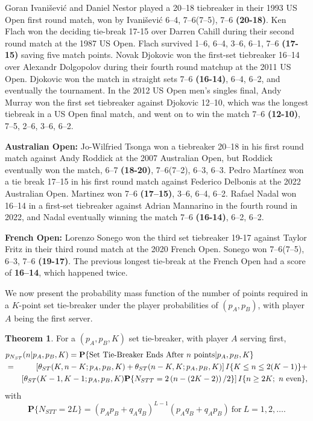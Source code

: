 \documentclass[11pt]{article}
\theoremstyle{plain}
\theoremstyle{definition}
\newtheorem{theorem}{Theorem}[section]
\renewcommand{\Pr}{\mathbf{P}}
\begin{document}
\smallskip

 Goran Ivanišević and Daniel Nestor played a 20–18 tiebreaker in their 1993 US Open first round match, won by Ivanišević 6–4, 7–6(7–5), 7–6 {\bf (20-18)}. Ken Flach won the deciding tie-break {17-15} over Darren Cahill during their second round match at the 1987 US Open. Flach survived 1–6, 6–4, 3–6, 6–1, 7–6 {\bf (17-15)}  saving five match points. Novak Djokovic won the first-set tiebreaker 16–14 over Alexandr Dolgopolov during their fourth round matchup at the 2011 US Open. Djokovic won the match in straight sets 7–6 {\bf (16-14)}, 6–4, 6–2, and eventually the tournament. In the 2012 US Open men's singles final, Andy Murray won the first set tiebreaker against Djokovic 12–10, which was the longest tiebreak in a US Open final match, and went on to win the match 7–6 {\bf (12-10)}, 7–5, 2–6, 3–6, 6–2. 

\smallskip

\noindent
{\bf Australian Open:} Jo-Wilfried Tsonga won a tiebreaker 20–18 in his first round match against Andy Roddick at the 2007 Australian Open, but Roddick eventually won the match, 6–7 {\bf (18-20)}, 7–6(7–2), 6–3, 6–3. Pedro Martínez won a tie break 17–15 in his first round match against Federico Delbonis at the 2022 Australian Open. Martinez won 7–6 {\bf (17–15)}, 3–6, 6–4, 6–2. Rafael Nadal won 16–14 in a first-set tiebreaker against Adrian Mannarino in the fourth round in 2022, and Nadal eventually winning the match 7–6 {\bf (16-14)}, 6–2, 6–2. 

\smallskip

\noindent
{\bf French Open:} Lorenzo Sonego won the third set tiebreaker {19-17} against Taylor Fritz in their third round match at the 2020 French Open. Sonego won 7–6(7–5), 6–3, 7–6 {\bf (19-17)}. The previous longest tie-break at the French Open had a score of {\bf 16–14}, which happened twice. 

\medskip

We now present the probability mass function of the number of points required in a $K$-point set tie-breaker under the player probabilities of $(p_A,p_B)$, with player $A$ being the first server.


\begin{theorem}
    For a $(p_A,p_B,K)$ set tie-breaker, with player $A$ serving first,
\begin{eqnarray*}
    \lefteqn{ p_{N_{ST}}(n|p_A,p_B,K) = \Pr\{\mbox{Set Tie-Breaker Ends After $n$ points}|p_A,p_B,K\} } \\ & = &
    \left[\theta_{ST}(K,n-K;p_A,p_B,K) + \theta_{ST}(n-K,K;p_A,p_B,K)\right] I\{K \le n \le 2(K-1)\} + \\ &&
   \left[\theta_{ST}(K-1,K-1;p_A,p_B,K) \Pr\{N_{STT} = 2\left(n - (2K-2)\right)/2\} \right] 
   I\{n \ge 2K;\ n\ \mbox{even}\},
\end{eqnarray*}
%
with
%
$$\Pr\{N_{STT} = 2L\} =  (p_Ap_B + q_Aq_B)^{L-1} (p_Aq_B + q_Ap_B) \ \mbox{for}\ L=1,2,\ldots.$$
\end{theorem}
\end{document}
